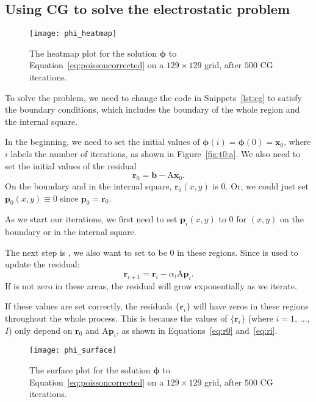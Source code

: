 \subsection{Using CG to solve the electrostatic problem}

\begin{figure}[!hbt]
    \centering
    \texttt{[image: phi\_heatmap]}
    \caption{The heatmap plot for the solution \(\bm{\phi}\) to
        Equation~\eqref{eq:poissoncorrected} on a \(129 \times 129\) grid,
        after \(500\) CG iterations.}
    \label{fig:phi_heatmap}
\end{figure}

To solve the problem, we need to change the
code in Snippets~\ref{lst:cg} to satisfy the boundary conditions, which includes
the boundary of the whole region and the internal square.

In the beginning, we need to set the initial values of
\(\bm{\phi}(i) = \bm{\phi}(0) = \bm{x}_0\),
where \(i\) labels the number of iterations, as shown in Figure~\ref{fig:t0:a}.
We also need to set the initial values of the residual
%
\begin{equation}\label{eq:r0}
    \bm{r}_0 = \bm{b} - \mathrm{A} \bm{x}_0.
\end{equation}
%
On the boundary and in the internal square, \(\bm{r}_0(x, y)\) is \(0\).
Or, we could just set \(\bm{p}_0(x, y) \equiv 0\) since \(\bm{p}_0 = \bm{r}_0\).

As we start our iterations, we first need to set \(\bm{p}_i(x, y)\) to \(0\)
for \((x, y)\) on the boundary or in the internal square.

The next step is , we also want to set  to be \(0\)
in these regions. Since  is used to update the residual:
%
\begin{equation}\label{eq:ri}
    \bm{r}_{i+1} = \bm{r}_i - \alpha_i \mathrm{A} \bm{p}_i.
\end{equation}
%
If  is not zero in these areas, the residual will grow exponentially
as we iterate.

If these values are set correctly, the residuals \(\{\bm{r}_i\}\) will have
zeros in these regions throughout the whole process.
This is because the values of \(\{\bm{r}_i\}\) (where \(i = 1\), \(\ldots\), \(I\))
only depend on \(\bm{r}_0\) and \(\mathrm{A} \bm{p}_i\), as shown in
Equations~\eqref{eq:r0} and~\eqref{eq:ri}.

\begin{figure}[!hbt]
    \centering
    \texttt{[image: phi\_surface]}
    \caption{The surface plot for the solution \(\bm{\phi}\) to
        Equation~\eqref{eq:poissoncorrected} on a \(129 \times 129\) grid,
        after \(500\) CG iterations.}
    \label{fig:phi_surface}
\end{figure}


